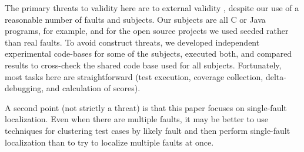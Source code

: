 The primary threats to validity here are to external validity
\cite{Threats}, despite our use of a reasonable number of faults and subjects.  Our subjects are all C or
Java programs, for example, and for the open source projects we used
seeded rather than real faults.  To avoid
construct threats, we developed independent experimental code-bases
for some of the subjects, executed both, and compared results to
cross-check the shared code base used for all subjects.  Fortunately,
most tasks here are straightforward (test execution, coverage
collection, delta-debugging, and calculation of scores).

A second point (not strictly a threat) is that this paper focuses on
single-fault localization.    Even when
there are multiple faults, it may be better to use techniques for
clustering test cases by likely fault 
\cite{Jones07,PLDI13,Podgurski03,Podgurski04} and then perform
single-fault localization than to try to localize multiple faults at
once.
